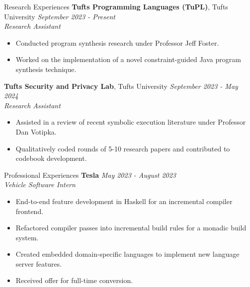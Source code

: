 \documentclass{resume} %
\begin{document}
\begin{rSection}{Research Experiences}
{\bf Tufts Programming Languages (TuPL)}{, Tufts University} \hfill {\em September 2023 - Present}\\
{\it Research Assistant}
\begin{itemize}
    \item Conducted program synthesis research under Professor Jeff Foster.
    \item Worked on the implementation of a novel constraint-guided Java program synthesis technique.
\end{itemize}
{\bf Tufts Security and Privacy Lab}{, Tufts University} \hfill {\em September 2023 - May 2024}\\
{\it Research Assistant}
\begin{itemize}
    \item Assisted in a review of recent symbolic execution literature under Professor Dan Votipka.
    \item Qualitatively coded rounds of 5-10 research papers and contributed to codebook development.
\end{itemize}
\end{rSection}


\begin{rSection}{Professional Experiences}
{\bf Tesla} \hfill {\em May 2023 - August 2023}\\
\hfill {\it Vehicle Software Intern}
\begin{itemize}
    \item End-to-end feature development in Haskell for an incremental compiler frontend.
    \item Refactored compiler passes into incremental build rules for a monadic build system.
    \item Created embedded domain-specific languages to implement new language server features.
    \item Received offer for full-time conversion.
\end{itemize}
\end{rSection}
\end{document}
